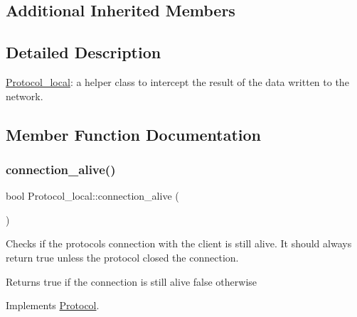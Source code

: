 \subsection*{Additional Inherited Members}


\subsection{Detailed Description}
\mbox{\hyperlink{classProtocol__local}{Protocol\+\_\+local}}\+: a helper class to intercept the result of the data written to the network. 

\subsection{Member Function Documentation}
\mbox{\label{classProtocol__local_afdd93469cdacbec6cc7ac1a4379c7c40}} 
\subsubsection{\texorpdfstring{connection\+\_\+alive()}{connection\_alive()}}
{\footnotesize\ttfamily bool Protocol\+\_\+local\+::connection\+\_\+alive (\begin{DoxyParamCaption}{ }\end{DoxyParamCaption})\hspace{0.3cm}{\ttfamily [virtual]}}

Checks if the protocol\textquotesingle{}s connection with the client is still alive. It should always return true unless the protocol closed the connection.

\begin{DoxyReturn}{Returns}
true if the connection is still alive false otherwise 
\end{DoxyReturn}


Implements \mbox{\hyperlink{classProtocol_af4ed0f36d7e3458766d522432bf4f2d5}{Protocol}}.

\mbox{\label{classProtocol__local_adc7012afe880218e2903dac0a22f0f8c}} 
